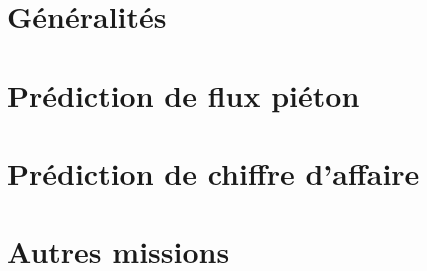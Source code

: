 
\section{Généralités}

\section{Prédiction de flux piéton}

\section{Prédiction de chiffre d'affaire}

\section{Autres missions}